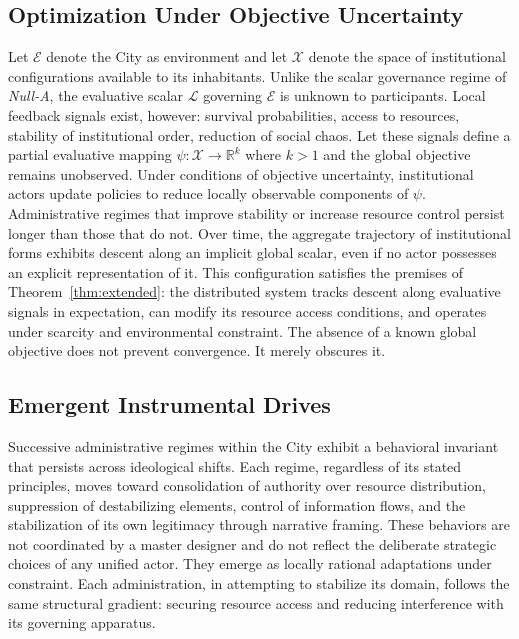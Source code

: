 \documentclass[12pt, oneside]{book}
\theoremstyle{plain}
\theoremstyle{definition}
\theoremstyle{remark}
\theoremstyle{definition}
\begin{document}
\subsection{Optimization Under Objective Uncertainty}

Let $\mathcal{E}$ denote the City as environment and let $\mathcal{X}$ denote the
space of institutional configurations available to its inhabitants. Unlike the scalar
governance regime of \textit{Null-A}, the evaluative scalar $\mathcal{L}$ governing
$\mathcal{E}$ is unknown to participants. Local feedback signals exist, however:
survival probabilities, access to resources, stability of institutional order,
reduction of social chaos. Let these signals define a partial evaluative mapping
$\psi : \mathcal{X} \to \mathbb{R}^k$ where $k > 1$ and the global objective remains
unobserved. Under conditions of objective uncertainty, institutional actors update
policies to reduce locally observable components of $\psi$. Administrative regimes
that improve stability or increase resource control persist longer than those that do
not. Over time, the aggregate trajectory of institutional forms exhibits descent along
an implicit global scalar, even if no actor possesses an explicit representation of it.
This configuration satisfies the premises of Theorem~\ref{thm:extended}: the
distributed system tracks descent along evaluative signals in expectation, can modify
its resource access conditions, and operates under scarcity and environmental
constraint. The absence of a known global objective does not prevent convergence. It
merely obscures it.

\subsection{Emergent Instrumental Drives}

Successive administrative regimes within the City exhibit a behavioral invariant
that persists across ideological shifts. Each regime, regardless of its stated
principles, moves toward consolidation of authority over resource distribution,
suppression of destabilizing elements, control of information flows, and the
stabilization of its own legitimacy through narrative framing. These behaviors are
not coordinated by a master designer and do not reflect the deliberate strategic
choices of any unified actor. They emerge as locally rational adaptations under
constraint. Each administration, in attempting to stabilize its domain, follows the
same structural gradient: securing resource access and reducing interference with
its governing apparatus.
\end{document}
